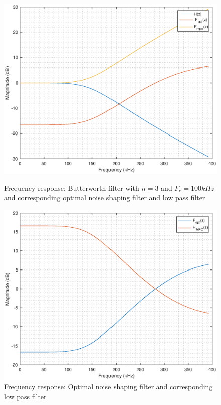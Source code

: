 \documentclass[a4paper]{article}
\begin{document}
\begin{figure}[!h]
	\centering
	\begin{minipage}{0.45\linewidth}
		\centering
		\includegraphics[scale = 0.45]{mat_plots/butter_3_100khz_1Mhz_1.eps}
		\caption{Frequency response: Butterworth filter with $n = 3$ and $F_{c} = 100\mathit{kHz}$ and corresponding optimal noise shaping filter and low pass filter}
	\end{minipage}
	\hfil
	\begin{minipage}{0.45\linewidth}
		\centering
		\includegraphics[scale = 0.45]{mat_plots/butter_3_100khz_1Mhz_2.eps}
		\caption{Frequency response: Optimal noise shaping filter and corresponding low pass filter}
	\end{minipage}
\end{figure}

\newpage

 
\end{document}
